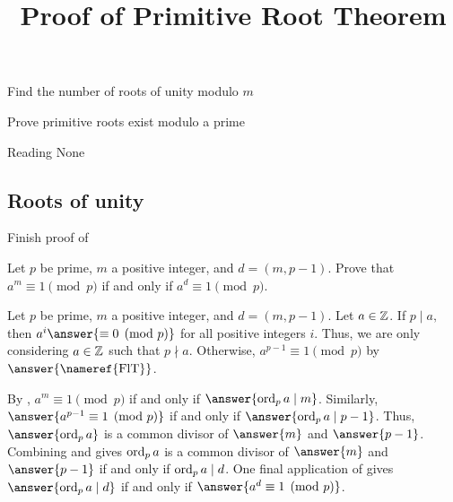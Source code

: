 \documentclass{ximera}
\title{Proof of Primitive Root Theorem}
\begin{document}
\begin{abstract}
\end{abstract}
\maketitle


\begin{obj}
    \item Find the number of roots of unity modulo $m$
    \item Prove primitive roots exist modulo a prime
\end{obj}


\begin{pre}
    \item[Reading] None
\end{pre}

\subsection*{Roots of unity}

Finish proof of 


\begin{br}\label{br:condition-root-unity}
    Let $p$ be prime, $m$ a positive integer, and $d=(m,p-1).$ Prove that $a^m\equiv 1\pmod{p}$ if and only if $a^d\equiv 1\pmod{p}.$


    \begin{solution}
        Let $p$ be prime, $m$ a positive integer, and $d=(m,p-1).$ Let $a\in\mathbb Z$. If $p\mid a,$ then $a^i\answer{\equiv 0\pmod{p}}$ for all positive integers $i$. 
        Thus, we are only considering $a\in\mathbb Z$ such that $p\nmid a.$
        Otherwise, $a^{p-1}\equiv 1\pmod{p}$ by $\answer{\textnormal{\nameref{FlT}}}$.
        
        By , $a^m\equiv 1\pmod{p}$ if and only if $\answer{\ord_p a \mid m}$. Similarly, $\answer{a^{p-1}\equiv 1\pmod{p}}$ if and only if $\answer{\ord_p a \mid p-1}$. Thus, $\answer{\ord_p a}$ is a common divisor of $\answer{m}$ and $\answer{p-1}$. Combining  and  gives $\operatorname{ord}_p a$ is a common divisor of   $\answer{m}$ and $\answer{p-1}$ if and only if $\operatorname{ord}_p a\mid d$. One final application of  gives $\answer{\ord_p a\mid d}$ if and only if $\answer{a^d\equiv 1\pmod{p}}$.
    \end{solution}
\end{br}
\end{document}
